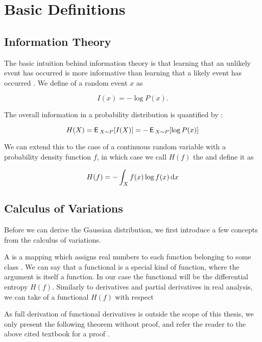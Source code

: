 \chapter{Basic Definitions}

\section{Information Theory}

The basic intuition behind information theory is that learning that an unlikely
event has occurred is more informative than learning that a likely event has
occurred \citep{Goodfellow-et-al-2016}. We define  of
a random event $x$ as

\begin{equation}
  I(x) = -\log P(x).
\end{equation}

The overall information in a probability distribution is quantified by
:

\begin{equation}
  H(X) = \operatorname{\textsf{E}\,}_{X \sim P} [ I(X) ] = -\operatorname{\textsf{E}\,}_{X \sim P} [ \log P(x) ]
\end{equation}

We can extend this to the case of a continuous random variable with a
probability density function $f$, in which case we call $H(f)$ the
 and define it as

\begin{equation}
  H(f) = - \int_X f(x) \log f(x) \mathop{}\!\mathrm{d} x
\end{equation}

\section{Calculus of Variations}

Before we can derive the Gaussian distribution, we first introduce a few
concepts from the calculus of variations.

A  is a mapping which assigns real numbers to each function
belonging to some class \citep{gelfand2012calculus}. We can say that a
functional is a special kind of function, where the argument is itself a
function. In our case the functional will be the differential entropy $H(f)$.
Similarly to derivatives and partial derivatives in real analysis, we can take
 of a functional $H(f)$ with respect

As full derivation of functional derivatives is outside the scope of this
thesis, we only present the following theorem without proof, and refer the
reader to the above cited textbook for a proof .

